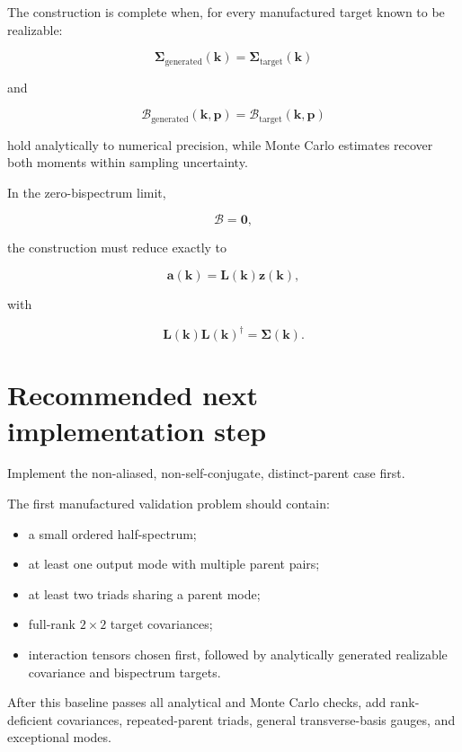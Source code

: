 \documentclass[
  11pt,
  a4paper,
]{article}
\providecommand{\tightlist}{%
  \setlength{\itemsep}{0pt}\setlength{\parskip}{0pt}}
\begin{document}
The construction is complete when, for every manufactured target known
to be realizable:

\[
\boldsymbol\Sigma_{\mathrm{generated}}(\boldsymbol k)
=
\boldsymbol\Sigma_{\mathrm{target}}(\boldsymbol k)
\]

and

\[
\mathcal B_{\mathrm{generated}}(\boldsymbol k,\boldsymbol p)
=
\mathcal B_{\mathrm{target}}(\boldsymbol k,\boldsymbol p)
\]

hold analytically to numerical precision, while Monte Carlo estimates
recover both moments within sampling uncertainty.

In the zero-bispectrum limit,

\[
\mathcal B=\boldsymbol0,
\]

the construction must reduce exactly to

\[
\boldsymbol a(\boldsymbol k)
=
\boldsymbol L(\boldsymbol k)\boldsymbol z(\boldsymbol k),
\]

with

\[
\boldsymbol L(\boldsymbol k)
\boldsymbol L(\boldsymbol k)^\dagger
=
\boldsymbol\Sigma(\boldsymbol k).
\]

\section{Recommended next implementation
step}\label{recommended-next-implementation-step}

Implement the non-aliased, non-self-conjugate, distinct-parent case
first.

The first manufactured validation problem should contain:

\begin{itemize}
\tightlist
\item
  a small ordered half-spectrum;
\item
  at least one output mode with multiple parent pairs;
\item
  at least two triads sharing a parent mode;
\item
  full-rank \(2\times2\) target covariances;
\item
  interaction tensors chosen first, followed by analytically generated
  realizable covariance and bispectrum targets.
\end{itemize}

After this baseline passes all analytical and Monte Carlo checks, add
rank-deficient covariances, repeated-parent triads, general
transverse-basis gauges, and exceptional modes.
\end{document}
